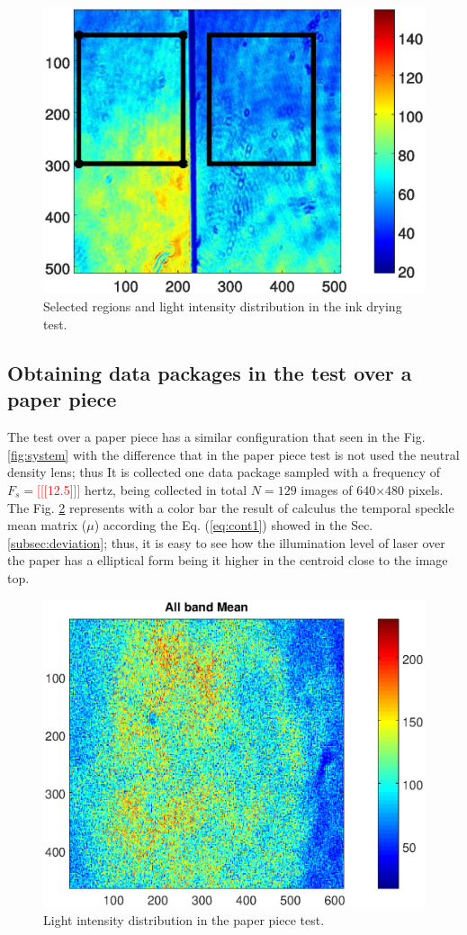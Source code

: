 \documentclass[review]{elsarticle}
\begin{document}
\begin{figure}[h!]
\centering
\includegraphics[width=0.85\columnwidth]{meanall_points_all.eps}
\caption{Selected regions and light intensity distribution in the ink drying test.}
\label{fig:regions}
\end{figure}

\subsection{Obtaining data packages in the test over a paper piece}
\label{sec:descriptionpaper}
The test over a paper piece has a similar configuration that seen in
the Fig. \ref{fig:system} with the difference that in the paper piece test is not used
the neutral density lens; thus It is collected one data package
sampled with a frequency of $F_s=$\textcolor{red}{[[[12.5]]]} hertz, being 
collected in total $N=129$ images of 640$\times$480 pixels.
The Fig. \ref{fig:meanpaper} represents
with a color bar the result of  calculus the temporal speckle mean matrix ($\mu$) according the Eq. (\ref{eq:cont1})
showed in the Sec. \ref{subsec:deviation}; thus, it is easy to see how the
illumination level of laser over the paper has a elliptical form being it higher 
in the centroid close to the image top.
\begin{figure}[h!]
\centering
\includegraphics[width=0.85\columnwidth]{meanall.eps}
\caption{Light intensity distribution in the paper piece test.}
\label{fig:meanpaper}
\end{figure}
\end{document}
